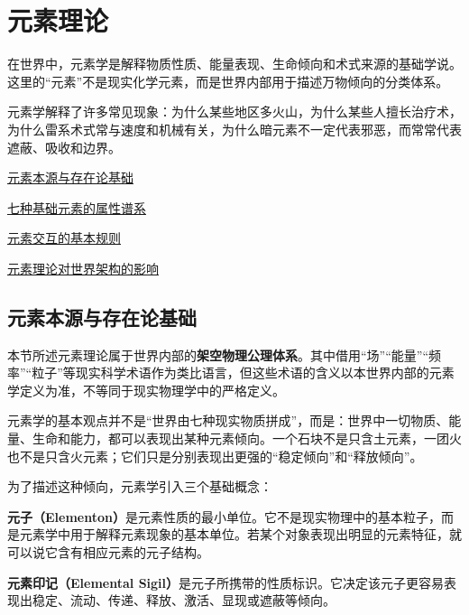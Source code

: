 \section{元素理论}\label{sec:elementtheory}
在\wkn{}世界中，元素学是解释物质性质、能量表现、生命倾向和术式来源的基础学说。这里的“元素”不是现实化学元素，而是世界内部用于描述万物倾向的分类体系。

元素学解释了许多常见现象：为什么某些地区多火山，为什么某些人擅长治疗术，为什么雷系术式常与速度和机械有关，为什么暗元素不一定代表邪恶，而常常代表遮蔽、吸收和边界。

\begin{introduction}
    \item \hyperref[subsec:elementorigin]{元素本源与存在论基础}
    \item \hyperref[subsec:elementproperties]{七种基础元素的属性谱系}
    \item \hyperref[subsec:elementinteraction]{元素交互的基本规则}
    \item \hyperref[subsec:elementinfluence]{元素理论对世界架构的影响}
\end{introduction}

\subsection{元素本源与存在论基础}\label{subsec:elementorigin}

\begin{remark}
    本节所述元素理论属于\wkn{}世界内部的\textbf{架空物理公理体系}。其中借用“场”“能量”“频率”“粒子”等现实科学术语作为类比语言，但这些术语的含义以本世界内部的元素学定义为准，不等同于现实物理学中的严格定义。
\end{remark}

元素学的基本观点并不是“世界由七种现实物质拼成”，而是：世界中一切物质、能量、生命和能力，都可以表现出某种元素倾向。一个石块不是只含土元素，一团火也不是只含火元素；它们只是分别表现出更强的“稳定倾向”和“释放倾向”。

为了描述这种倾向，元素学引入三个基础概念：
\begin{definition}[元子]
    \textbf{元子（Elementon）}是元素性质的最小单位。它不是现实物理中的基本粒子，而是元素学中用于解释元素现象的基本单位。若某个对象表现出明显的元素特征，就可以说它含有相应元素的元子结构。
\end{definition}

\begin{definition}[元素印记]
    \textbf{元素印记（Elemental Sigil）}是元子所携带的性质标识。它决定该元子更容易表现出稳定、流动、传递、释放、激活、显现或遮蔽等倾向。
\end{definition}

